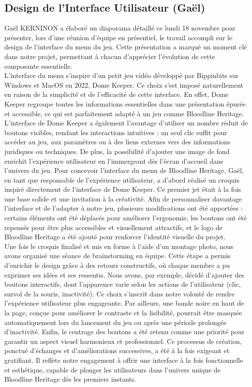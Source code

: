\documentclass{report}
\begin{document}
\subsection*{Design de l'Interface Utilisateur (Gaël)}
Gaël KERNINON a élaboré un diaporama détaillé ce lundi 18 novembre pour présenter, lors d'une réunion d'équipe en présentiel, le travail accompli sur le design de l'interface du menu du jeu. Cette présentation a marqué un moment clé dans notre projet, permettant à chacun d’apprécier l’évolution de cette composante essentielle.
\\[0.4cm]
L’interface du menu s’inspire d’un petit jeu vidéo développé par Bippinbits sur Windows et MacOS en 2022, Dome Keeper. Ce choix s'est imposé naturellement en raison de la simplicité et de l'efficacité de cette interface. En effet, Dome Keeper regroupe toutes les informations essentielles dans une présentation épurée et accessible, ce qui est parfaitement adapté à un jeu comme Bloodline Heritage. L'interface de Dome Keeper a également l'avantage d'utiliser un nombre réduit de boutons visibles, rendant les interactions intuitives : un seul clic suffit pour accéder au jeu, aux paramètres ou à des liens externes vers des informations juridiques ou techniques. De plus, la possibilité d’ajouter une image de fond enrichit l’expérience utilisateur en l’immergeant dès l’écran d’accueil dans l’univers du jeu. Pour concevoir l’interface du menu de Bloodline Heritage, Gaël, en tant que responsable de l’expérience utilisateur, a d’abord réalisé un croquis inspiré directement de l’interface de Dome Keeper. Ce premier jet était à la fois une base solide et une invitation à la créativité. Afin de personnaliser davantage l’interface et de l’adapter à notre jeu, plusieurs modifications ont été apportées : certains éléments ont été déplacés pour améliorer l’ergonomie, les boutons ont été repensés pour être plus accessibles et visuellement attractifs, et le logo de Bloodline Heritage a été ajouté pour renforcer l’identité visuelle du projet.
\\[0.4cm]
Une fois le croquis finalisé et mis en forme à l’aide d’un montage photo, nous avons organisé une séance de brainstorming en équipe. Cette étape a permis d’enrichir le design grâce à des retours constructifs, où chaque membre a pu exprimer ses idées et ses ressentis. Nous avons, par exemple, décidé d’ajouter des boutons interactifs, dont l’apparence varie selon les actions de l’utilisateur (clic, survol de la souris, inactivité). Ce choix s’inscrit dans notre volonté de rendre l’expérience utilisateur plus engageante. Par ailleurs, une bande noire en haut de la page, conçue pour améliorer le contraste et la lisibilité, pourrait être masquée automatiquement lors du lancement du jeu ou après une période prolongée d’inactivité. Enfin, le centrage des boutons a été retenu comme une priorité pour garantir un aspect visuel harmonieux et professionnel. Ce processus de création, ponctué d'échanges et d'améliorations successives, a été à la fois exigeant et gratifiant. Il reflète notre engagement à offrir une interface à la fois fonctionnelle et esthétique, capable de plonger les utilisateurs dans l'univers unique de Bloodline Heritage dès les premiers instants.
\end{document}

